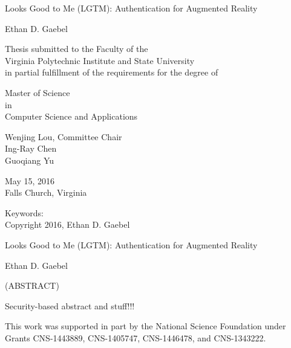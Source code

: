 \documentclass[12pt]{report}
\begin{document}
\thispagestyle{empty}
\begin{center}

{\Large 
Looks Good to Me (LGTM): 
Authentication for Augmented Reality
}

\vfill

Ethan D. Gaebel

\vfill

Thesis submitted to the Faculty of the \\
Virginia Polytechnic Institute and State University \\
in partial fulfillment of the requirements for the degree of

\vfill

Master of Science \\
in \\
Computer Science and Applications

\vfill

Wenjing Lou, Committee Chair \\
Ing-Ray Chen \\
Guoqiang Yu 

\vfill

May 15, 2016 \\
Falls Church, Virginia

\vfill

Keywords: 
\\
Copyright 2016, Ethan D. Gaebel

\end{center}

\pagebreak

\thispagestyle{empty}
\begin{center}

{\large Looks Good to Me (LGTM): 
Authentication for Augmented Reality}

\vfill

Ethan D. Gaebel

\vfill

(ABSTRACT)



\vfill

\end{center}

Security-based abstract and stuff!!!

\vfill

This work was supported in part by the National Science Foundation under Grants 
CNS-1443889, CNS-1405747, CNS-1446478, and CNS-1343222.

\pagebreak
\end{document}
